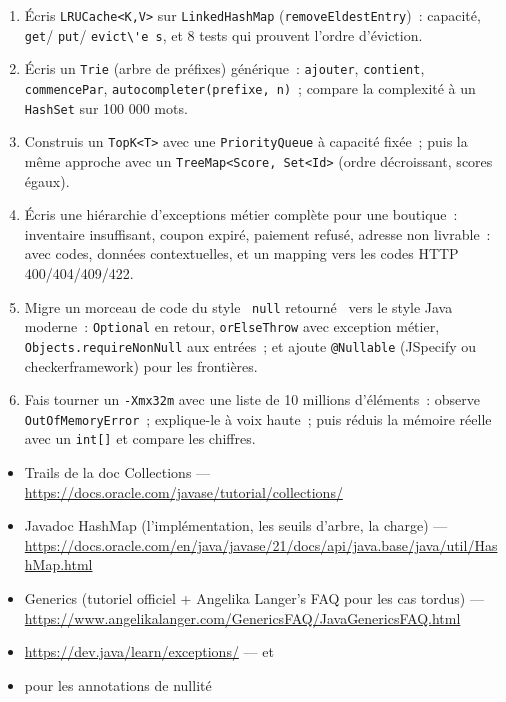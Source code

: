 \begin{exercice}
\begin{enumerate}
  \item \'Ecris \verb|LRUCache<K,V>| sur \verb|LinkedHashMap| (\verb|removeEldestEntry|)~: capacit\'e,
        \verb|get|/ \verb|put|/ \verb|evict\'e s|, et 8 tests qui prouvent l'ordre d'\'eviction.
  \item \'Ecris un \verb|Trie| (arbre de pr\'efixes) g\'en\'erique~: \verb|ajouter|, \verb|contient|,
        \verb|commencePar|, \verb|autocompleter(prefixe, n)|~; compare la complexit\'e \`a un
        \verb|HashSet| sur 100 000 mots.
  \item Construis un \verb|TopK<T>| avec une \verb|PriorityQueue| \`a capacit\'e fix\'ee~; puis la
        m\^eme approche avec un \verb|TreeMap<Score, Set<Id>| (ordre d\'ecroissant, scores \'egaux).
  \item \'Ecris une hi\'erarchie d'exceptions m\'etier compl\`ete pour une boutique~: inventaire insuffisant,
        coupon expir\'e, paiement refus\'e, adresse non livrable~: avec codes, donn\'ees contextuelles,
        et un mapping vers les codes HTTP 400/404/409/422.
  \item Migre un morceau de code du style \og ~\verb|null| retourn\'e~ \fg{} vers le style Java moderne~:
        \verb|Optional| en retour, \verb|orElseThrow| avec exception m\'etier, \verb|Objects.requireNonNull|
        aux entr\'ees~; et ajoute \verb|@Nullable| (JSpecify ou checkerframework) pour les fronti\`eres.
  \item Fais tourner un \verb|-Xmx32m| avec une liste de 10 millions d'\'el\'ements~: observe
        \verb|OutOfMemoryError|~; explique-le \`a voix haute~; puis r\'eduis la m\'emoire r\'eelle avec un
        \verb|int[]| et compare les chiffres.
\end{enumerate}
\end{exercice}

\begin{ressources}
\begin{itemize}
  \item Trails de la doc Collections --- \url{https://docs.oracle.com/javase/tutorial/collections/}
  \item Javadoc HashMap (l'impl\'ementation, les seuils d'arbre, la charge) --- \url{https://docs.oracle.com/en/java/javase/21/docs/api/java.base/java/util/HashMap.html}
  \item Generics (tutoriel officiel + Angelika Langer's FAQ pour les cas tordus) --- \url{https://www.angelikalanger.com/GenericsFAQ/JavaGenericsFAQ.html}
  \item \url{https://dev.java/learn/exceptions/} --- et 
  \item {} pour les annotations de nullit\'e
\end{itemize}
\end{ressources}

